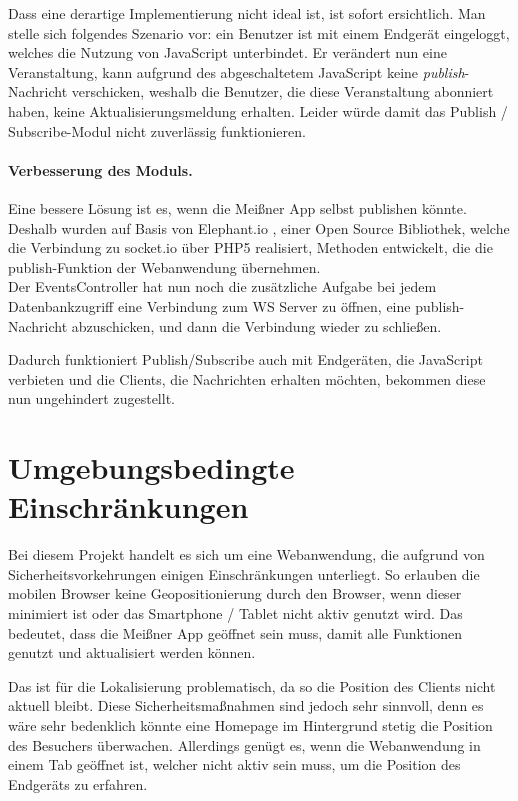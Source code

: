 Dass eine derartige Implementierung nicht ideal ist, ist sofort ersichtlich. Man stelle sich folgendes Szenario vor: ein Benutzer ist mit einem Endgerät eingeloggt, welches die Nutzung von JavaScript unterbindet. Er verändert nun eine Veranstaltung, kann aufgrund des abgeschaltetem JavaScript keine \emph{publish}-Nachricht verschicken, weshalb die Benutzer, die diese Veranstaltung abonniert haben, keine Aktualisierungsmeldung erhalten. Leider würde damit das Publish / Subscribe-Modul nicht zuverlässig funktionieren.

\paragraph{Verbesserung des Moduls.}
Eine bessere Lösung ist es, wenn die Meißner App selbst publishen könnte. Deshalb wurden auf Basis von Elephant.io \cite{elephant.io}, einer Open Source Bibliothek, welche die Verbindung zu socket.io über PHP5 realisiert, Methoden entwickelt, die die publish-Funktion der Webanwendung übernehmen.\\
Der EventsController hat nun noch die zusätzliche Aufgabe bei jedem Datenbankzugriff eine Verbindung zum WS Server zu öffnen, eine publish-Nachricht abzuschicken, und dann die Verbindung wieder zu schließen.\par

Dadurch funktioniert Publish/Subscribe auch mit Endgeräten, die JavaScript verbieten und die Clients, die Nachrichten erhalten möchten, bekommen diese nun ungehindert zugestellt.

\section{Umgebungsbedingte Einschränkungen}
Bei diesem Projekt handelt es sich um eine Webanwendung, die aufgrund von Sicherheitsvorkehrungen einigen Einschränkungen unterliegt. So erlauben die mobilen Browser keine Geopositionierung durch den Browser, wenn dieser minimiert ist oder das Smartphone / Tablet nicht aktiv genutzt wird. Das bedeutet, dass die Meißner App geöffnet sein muss, damit alle Funktionen genutzt und aktualisiert werden können.\par

Das ist für die Lokalisierung problematisch, da so die Position des Clients nicht aktuell bleibt. Diese Sicherheitsmaßnahmen sind jedoch sehr sinnvoll, denn es wäre sehr bedenklich könnte eine Homepage im Hintergrund stetig die Position des Besuchers überwachen. Allerdings genügt es, wenn die Webanwendung in einem Tab geöffnet ist, welcher nicht aktiv sein muss, um die Position des Endgeräts zu erfahren.


